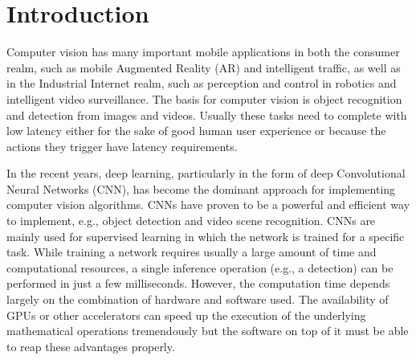 \documentclass[sigconf]{acmart}
\begin{document}




\maketitle

\section{Introduction}

Computer vision has many important mobile applications in both the consumer realm, such as mobile Augmented Reality (AR) and intelligent traffic, as well as in the Industrial Internet realm, such as perception and control in robotics and intelligent video surveillance. 
The basis for computer vision is object recognition and detection from images and videos. Usually these tasks need to complete with low latency either for the sake of good human user experience or because the actions they trigger have latency requirements.

In the recent years, deep learning, particularly in the form of deep Convolutional Neural Networks (CNN), has become the dominant approach for implementing computer vision algorithms\cite{lecun15nature}. CNNs have proven to be a powerful and efficient way to implement, e.g., object detection and video scene recognition. CNNs are mainly used for supervised learning in which the network is trained for a specific task. While training a network requires usually a large amount of time and computational resources, a single inference operation (e.g., a detection) can be performed in just a few milliseconds\cite{redmon16CVPR}. However, the computation time depends largely on the combination of hardware and software used. The availability of GPUs or other accelerators can speed up the execution of the underlying mathematical operations tremendously but the software on top of it must be able to reap these advantages properly.
\end{document}
